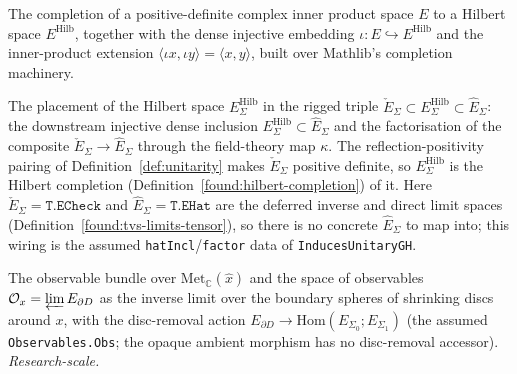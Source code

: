 \begin{definition}
  \label{found:hilbert-completion}
  \leanok
  The completion of a positive-definite complex inner product space $E$ to a Hilbert space
  $E^{\mathrm{Hilb}}$, together with the dense injective embedding
  $\iota \colon E \hookrightarrow E^{\mathrm{Hilb}}$ and the inner-product extension
  $\langle \iota x, \iota y\rangle = \langle x, y\rangle$, built over Mathlib's completion
  machinery.
\end{definition}

\begin{definition}
  \label{found:rigged-triple}
  \notready
  The placement of the Hilbert space $E_\Sigma^{\mathrm{Hilb}}$ in the rigged triple
  $\check E_\Sigma \subset E_\Sigma^{\mathrm{Hilb}} \subset \hat E_\Sigma$: the downstream
  injective dense inclusion $E_\Sigma^{\mathrm{Hilb}} \subset \hat E_\Sigma$ and the factorisation
  of the composite $\check E_\Sigma \to \hat E_\Sigma$ through the field-theory map $\kappa$. The
  reflection-positivity pairing of Definition~\ref{def:unitarity} makes $\check E_\Sigma$ positive
  definite, so $E_\Sigma^{\mathrm{Hilb}}$ is the Hilbert completion
  (Definition~\ref{found:hilbert-completion}) of it. Here $\check E_\Sigma = \mathtt{T.ECheck}$ and
  $\hat E_\Sigma = \mathtt{T.EHat}$ are the deferred inverse and direct limit spaces
  (Definition~\ref{found:tvs-limits-tensor}), so there is no concrete $\hat E_\Sigma$ to map into;
  this wiring is the assumed \texttt{hatIncl}/\texttt{factor} data of \texttt{InducesUnitaryGH}.
\end{definition}

\begin{definition}
  \label{found:observable-bundle}
  \notready
  The observable bundle over $\mathrm{Met}_{\mathbb C}(\hat x)$ and the space of observables
  $\mathcal O_x = \varprojlim E_{\partial D}$ as the inverse limit over the boundary spheres
  of shrinking discs around $x$, with the disc-removal action
  $E_{\partial D} \to \mathrm{Hom}(E_{\Sigma_0}; E_{\Sigma_1})$ (the assumed
  \texttt{Observables.Obs}; the opaque ambient morphism has no disc-removal accessor).
  \emph{Research-scale.}
\end{definition}

